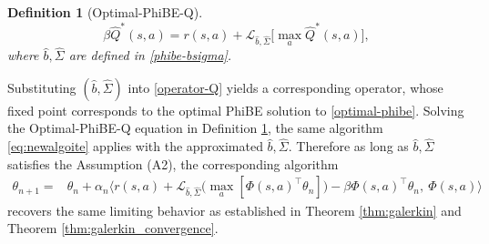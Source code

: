 \documentclass[12pt]{article}
\newtheorem{definition}{Definition}
\begin{document}

\begin{definition}[Optimal-PhiBE-Q]\label{def:phibe-q}
\begin{equation}\label{pde of Qhatstar}
    \beta \hat{Q}^*(s,a) = r(s,a) + \mathcal{L}_{\hat{b},\hat{\Sigma}} \big[\max_{a} \hat{Q}^*(s,a)\big] , 
\end{equation}
where $\hat{b}, \hat{\Sigma}$ are defined in \eqref{phibe-bsigma}. 
\end{definition}

Substituting $(\hat{b}, \hat{\Sigma})$ into \eqref{operator-Q} yields a corresponding operator, whose fixed point corresponds to the optimal PhiBE solution to \eqref{optimal-phibe}.
Solving the Optimal-PhiBE-Q equation in Definition \ref{def:phibe-q}, the same algorithm \eqref{eq:newalgoite} applies with the approximated $\hat{b}, \hat{\Sigma}$. Therefore as long as $\hat{b}, \hat{\Sigma}$ satisfies the Assumption (A2), the corresponding algorithm 
\begin{equation}\label{eq:newalgoite-phibe}
\begin{aligned}
\theta_{n+1} =& \theta_n  + \alpha_n \bigg\langle  r(s,a) + \mathcal{L}_{\hat{b},\hat{\Sigma}}  \Big(\max_a [\Phi(s,a)^\top \theta_n]\Big)-\beta \Phi(s,a)^\top \theta_n, \ \Phi(s,a) \bigg\rangle 
\end{aligned}
\end{equation}
recovers the same limiting behavior as established in Theorem \ref{thm:galerkin} and Theorem \ref{thm:galerkin_convergence}.
\end{document}
